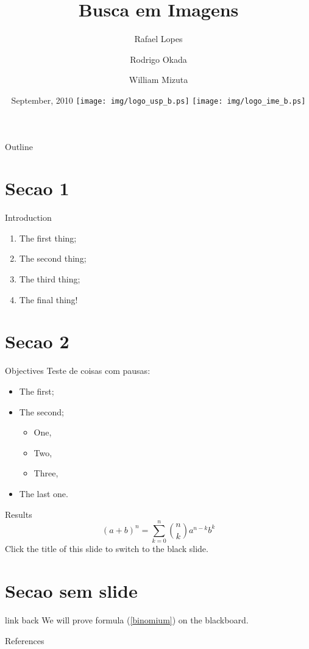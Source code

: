 \documentclass[
    style=paintings,
    paper=screen,
    blackslide,
    nopagebreaks,
    fleqn
]{powerdot}
\title{Busca em Imagens}
\author{Rafael Lopes \and Rodrigo Okada \and William Mizuta}
\date{
September, 2010
\vfill
\texttt{[image: img/logo\_usp\_b.ps]}
\texttt{[image: img/logo\_ime\_b.ps]}
}
\begin{document}
\maketitle

\begin{slide}{Outline}
\tableofcontents{}
\end{slide}

\section[slide=false]{Secao 1}
\begin{slide}{Introduction}
\begin{enumerate}[type=1]
\item The first thing;\pause
\item The second thing;\pause
\item The third thing;\pause
\item The final thing!
\end{enumerate}
\end{slide}


\section[slide=false]{Secao 2}

\begin{slide}{Objectives}
Teste de coisas com pausas:
\begin{itemize}[]
\item <2> The first;
\item <3> The second;
\begin{itemize}[type=1]
\item <4> One,
\item <5> Two,
\item <6> Three,
\end{itemize}
\item <7> The last one.
\end{itemize}
\end{slide}


\begin{slide}{Results}
  \begin{equation}\label{binomium}
      (a+b)^n=\sum_{k=0}^n{n\choose k}a^{n-k}b^k
        \end{equation}\pause
            Click the title of this slide to switch to the black slide.
\end{slide}


\section[slide=false]{Secao sem slide}
\begin{slide}{link back}
          We will prove formula (\ref{binomium}) on the blackboard.\\

\end{slide}



\begin{slide}{References}


\end{slide}
\end{document}
